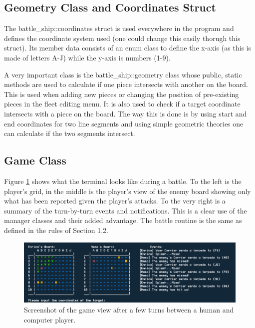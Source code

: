 \documentclass[11pt]{article} %
\begin{document}
\subsection{Geometry Class and Coordinates Struct}
The battle\_ship::coordinates struct is used everywhere in the program and defines
the coordinate system used (one could change this easily thorugh this struct).
Its member data consists of an enum class to define the x-axis (as this is made of letters A-J) while the y-axis is numbers (1-9).
\\
\par A very important class is the battle\_ship::geometry class whose public, static methods are used to calculate
if one piece intersects with another on the board.
This is used when adding new pieces or changing the position of pre-existing pieces in the fleet editing menu.
It is also used to check if a target coordinate intersects with a piece on the board.
The way this is done is by using start and end coordinates for two line segments and using
simple geometric theories \cite{patpro} one can calculate if the two segments intersect.

\subsection{Game Class}
Figure \ref{fig:game_view} shows what the terminal looks like during a battle.
To the left is the player's grid, in the middle is the player's view of the enemy board showing only what has been reported
given the player's attacks.
To the very right is a summary of the turn-by-turn events and notifications.
This is a clear use of the manager classes and their added advantage.
The battle routine is the same as defined in the rules of Section 1.2.
\begin{figure}[H]
\centering
\includegraphics[scale=0.55]{images/game.png}
\caption{Screenshot of the game view after a few turns between a human and computer player.}
\label{fig:game_view}
\end{figure}
\end{document}
